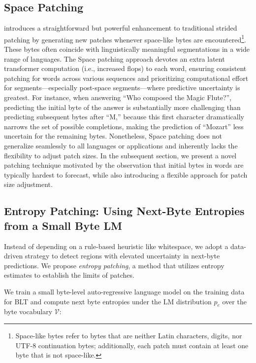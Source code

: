 \subsection{Space Patching}
\label{section:white-patch}

\citet{slagle2024spacebyte} introduces a straightforward but powerful enhancement to traditional strided patching by generating new patches whenever space-like bytes are encountered\footnote{
    Space-like bytes refer to bytes that are neither Latin characters, digits, nor UTF-8 continuation bytes; additionally, each patch must contain at least one byte that is not space-like.}. These bytes often coincide with linguistically meaningful segmentations in a wide range of languages. The Space patching approach devotes an extra latent transformer computation (i.e., increased flops) to each word, ensuring consistent patching for words across various sequences and prioritizing computational effort for segments—especially post-space segments—where predictive uncertainty is greatest. For instance, when answering ``Who composed the Magic Flute?\uline{\hspace{.6em}}'', predicting the initial byte of the answer is substantially more challenging than predicting subsequent bytes after ``M,'' because this first character dramatically narrows the set of possible completions, making the prediction of ``Mozart'' less uncertain for the remaining bytes. Nonetheless, Space patching does not generalize seamlessly to all languages or applications and inherently lacks the flexibility to adjust patch sizes. In the subsequent section, we present a novel patching technique motivated by the observation that initial bytes in words are typically hardest to forecast, while also introducing a flexible approach for patch size adjustment.

\subsection{Entropy Patching: Using Next-Byte Entropies from a Small Byte LM}
\label{section:dyn-patch}

Instead of depending on a rule-based heuristic like whitespace, we adopt a data-driven strategy to detect regions with elevated uncertainty in next-byte predictions. We propose \textit{entropy patching}, a method that utilizes entropy estimates to establish the limits of patches.

We train a small byte-level auto-regressive language model on the training data for {\textsc BLT} and compute next byte entropies under the LM distribution $p_{e}$ over the byte vocabulary $\mathcal{V}$:

